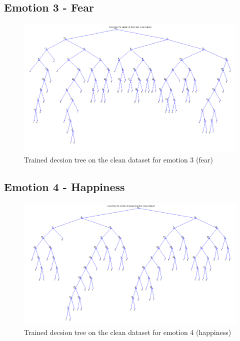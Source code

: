 \documentclass[a4paper]{article}
\begin{document}
\subsection{Emotion 3 - Fear}
\begin{figure}[H]
\center
\includegraphics[width=0.9\columnwidth]{FearTree} %
\caption{Trained decsion tree on the clean dataset for emotion 3 (fear)}
\end{figure}

\bigskip\bigskip\bigskip\bigskip\bigskip\bigskip
\subsection{Emotion 4 - Happiness}
\begin{figure}[H]
\center
\includegraphics[width=0.9\columnwidth]{HappinessTree} %
\caption{Trained decsion tree on the clean dataset for emotion 4 (happiness)}
\end{figure}
\end{document}
